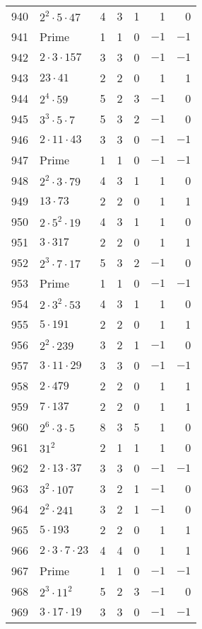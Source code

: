 \documentclass[12pt]{article}
\begin{document}
\begin{tabular}{|r|l|r|r|r|r|r|}
940 & $2^2 \cdot 5 \cdot 47$ & 4 & 3 & 1 & 1 & 0 \\
941 & Prime & 1 & 1 & 0 & $-1$ & $-1$ \\
942 & $2 \cdot 3 \cdot 157$ & 3 & 3 & 0 & $-1$ & $-1$ \\
943 & $23 \cdot 41$ & 2 & 2 & 0 & 1 & 1 \\
944 & $2^4 \cdot 59$ & 5 & 2 & 3 & $-1$ & 0 \\
945 & $3^3 \cdot 5 \cdot 7$ & 5 & 3 & 2 & $-1$ & 0 \\
946 & $2 \cdot 11 \cdot 43$ & 3 & 3 & 0 & $-1$ & $-1$ \\
947 & Prime & 1 & 1 & 0 & $-1$ & $-1$ \\
948 & $2^2 \cdot 3 \cdot 79$ & 4 & 3 & 1 & 1 & 0 \\
949 & $13 \cdot 73$ & 2 & 2 & 0 & 1 & 1 \\
950 & $2 \cdot 5^2 \cdot 19$ & 4 & 3 & 1 & 1 & 0 \\
951 & $3 \cdot 317$ & 2 & 2 & 0 & 1 & 1 \\
952 & $2^3 \cdot 7 \cdot 17$ & 5 & 3 & 2 & $-1$ & 0 \\
953 & Prime & 1 & 1 & 0 & $-1$ & $-1$ \\
954 & $2 \cdot 3^2 \cdot 53$ & 4 & 3 & 1 & 1 & 0 \\
955 & $5 \cdot 191$ & 2 & 2 & 0 & 1 & 1 \\
956 & $2^2 \cdot 239$ & 3 & 2 & 1 & $-1$ & 0 \\
957 & $3 \cdot 11 \cdot 29$ & 3 & 3 & 0 & $-1$ & $-1$ \\
958 & $2 \cdot 479$ & 2 & 2 & 0 & 1 & 1 \\
959 & $7 \cdot 137$ & 2 & 2 & 0 & 1 & 1 \\
960 & $2^6 \cdot 3 \cdot 5$ & 8 & 3 & 5 & 1 & 0 \\
961 & $31^2$ & 2 & 1 & 1 & 1 & 0 \\
962 & $2 \cdot 13 \cdot 37$ & 3 & 3 & 0 & $-1$ & $-1$ \\
963 & $3^2 \cdot 107$ & 3 & 2 & 1 & $-1$ & 0 \\
964 & $2^2 \cdot 241$ & 3 & 2 & 1 & $-1$ & 0 \\
965 & $5 \cdot 193$ & 2 & 2 & 0 & 1 & 1 \\
966 & $2 \cdot 3 \cdot 7 \cdot 23$ & 4 & 4 & 0 & 1 & 1 \\
967 & Prime & 1 & 1 & 0 & $-1$ & $-1$ \\
968 & $2^3 \cdot 11^2$ & 5 & 2 & 3 & $-1$ & 0 \\
969 & $3 \cdot 17 \cdot 19$ & 3 & 3 & 0 & $-1$ & $-1$ \\

\end{tabular}
\end{document}
